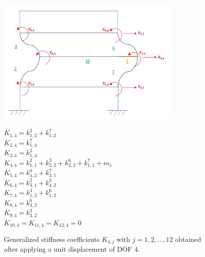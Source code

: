 \documentclass[11pt,a4paper,titlepage]{report}
\begin{document}
\begin{figure} [h]
\begin{minipage}{0.59\linewidth}
        \centering
         \includegraphics[width=9cm]{U=4.jpeg}
\end{minipage}
\begin{minipage}{0.4\linewidth}
\begin{small}
        $K_{1,4} = k^2_{1,2}+k^7_{1,2}$\\
        $K_{2,4} = k^7_{1,4}$\\
        $K_{3,4} = k^2_{1,4}$\\
        $K_{4,4} = k^2_{1,1}+k^3_{2,2}+k^6_{2,2}+k^7_{1,1}+m_1$\\
        $K_{5,4} = k^6_{4,2}+k^7_{3,1}$\\
        $K_{6,4} = k^2_{3,1}+k^3_{4,2}$\\
        $K_{7,4} = k^3_{1,2}+k^6_{1,2}$\\
        $K_{8,4} = k^6_{3,2}$\\
        $K_{9,4} = k^3_{3,2}$\\
        $K_{10,4} = K_{11,4} = K_{12,4} = 0$\\
\end{small}
\end{minipage}
\caption{Generalized stiffness coefficients $K_{4,j}$ with $j=1,2,...,12$ obtained after applying a unit displacement of DOF 4.}
\label{fig: I.1 - u4=1}
\end{figure}
\newpage
\end{document}

